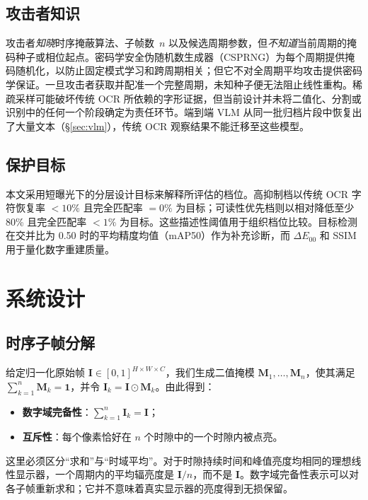 \documentclass{ieeeaccess}
\begin{document}
\subsection{攻击者知识}

攻击者\emph{知晓}时序掩蔽算法、子帧数~$n$ 以及候选周期参数，但\emph{不知道}当前周期的掩码种子或相位起点。密码学安全伪随机数生成器（CSPRNG）为每个周期提供掩码随机化，以防止固定模式学习和跨周期相关；但它不对全周期平均攻击提供密码学保证。一旦攻击者获取并配准一个完整周期，未知种子便无法阻止线性重构。稀疏采样可能破坏传统 OCR 所依赖的字形证据，但当前设计并未将二值化、分割或识别中的任何一个阶段确定为责任环节。端到端 VLM 从同一批归档片段中恢复出了大量文本（\S\ref{sec:vlm}），传统 OCR 观察结果不能迁移至这些模型。

\subsection{保护目标}

本文采用短曝光下的分层设计目标来解释所评估的档位。高抑制档以传统 OCR 字符恢复率 $<10\%$ 且完全匹配率 $=0\%$ 为目标；可读性优先档则以相对降低至少 80\% 且完全匹配率 $<1\%$ 为目标。这些描述性阈值用于组织档位比较。目标检测在交并比为 0.50 时的平均精度均值（mAP50）作为补充诊断，而 $\Delta E_{00}$ 和 SSIM 用于量化数字重建质量。


\section{系统设计}
\label{sec:method}

\subsection{时序子帧分解}

给定归一化原始帧 $\mathbf{I}\in[0,1]^{H\times W\times C}$，我们生成二值掩模 $\mathbf{M}_1,\ldots,\mathbf{M}_n$，使其满足 $\sum_{k=1}^{n}\mathbf{M}_k=\mathbf{1}$，并令 $\mathbf{I}_k=\mathbf{I}\odot\mathbf{M}_k$。由此得到：
\begin{itemize}
\item \textbf{数字域完备性}：$\sum_{k=1}^{n}\mathbf{I}_k = \mathbf{I}$；
\item \textbf{互斥性}：每个像素恰好在 $n$ 个时隙中的一个时隙内被点亮。
\end{itemize}
这里必须区分“求和”与“时域平均”。对于时隙持续时间和峰值亮度均相同的理想线性显示器，一个周期内的平均辐亮度是 $\mathbf{I}/n$，而不是 $\mathbf{I}$。数字域完备性表示可以对各子帧重新求和；它并不意味着真实显示器的亮度得到无损保留。
\end{document}
